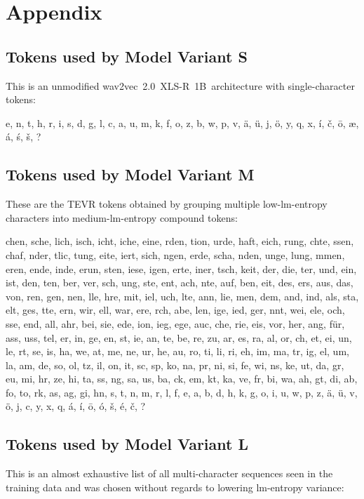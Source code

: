 \documentclass{article} \usepackage{iclr2022_conference,times}
\begin{document}
\newpage
\section{Appendix}

\subsection{Tokens used by Model Variant S}
This is an unmodified wav2vec~2.0~XLS-R~1B~architecture with single-character tokens:

e, n, t, h, r, i, s, d, g, l, c, a, u, m, k, f, o, z, b, w, p, v, ä, ü, j, ö, y, q, x, í, č, ō, æ, á, ś, š, ?


\subsection{Tokens used by Model Variant M}
These are the TEVR tokens obtained by grouping multiple low-lm-entropy characters into medium-lm-entropy compound tokens:

chen, sche, lich, isch, icht, iche, eine, rden, tion, urde, haft, eich, rung, chte, ssen, chaf, nder, tlic, tung, eite, iert, sich, ngen, erde, scha, nden, unge, lung, mmen, eren, ende, inde, erun, sten, iese, igen, erte, iner, tsch, keit, der, die, ter, und, ein, ist, den, ten, ber, ver, sch, ung, ste, ent, ach, nte, auf, ben, eit, des, ers, aus, das, von, ren, gen, nen, lle, hre, mit, iel, uch, lte, ann, lie, men, dem, and, ind, als, sta, elt, ges, tte, ern, wir, ell, war, ere, rch, abe, len, ige, ied, ger, nnt, wei, ele, och, sse, end, all, ahr, bei, sie, ede, ion, ieg, ege, auc, che, rie, eis, vor, her, ang, für, ass, uss, tel, er, in, ge, en, st, ie, an, te, be, re, zu, ar, es, ra, al, or, ch, et, ei, un, le, rt, se, is, ha, we, at, me, ne, ur, he, au, ro, ti, li, ri, eh, im, ma, tr, ig, el, um, la, am, de, so, ol, tz, il, on, it, sc, sp, ko, na, pr, ni, si, fe, wi, ns, ke, ut, da, gr, eu, mi, hr, ze, hi, ta, ss, ng, sa, us, ba, ck, em, kt, ka, ve, fr, bi, wa, ah, gt, di, ab, fo, to, rk, as, ag, gi, hn, s, t, n, m, r, l, f, e, a, b, d, h, k, g, o, i, u, w, p, z, ä, ü, v, ö, j, c, y, x, q, á, í, ō, ó, š, é, č, ?

\subsection{Tokens used by Model Variant L}
This is an almost exhaustive list of all multi-character sequences seen in the training data and was chosen without regards to lowering lm-entropy variance:
\end{document}
